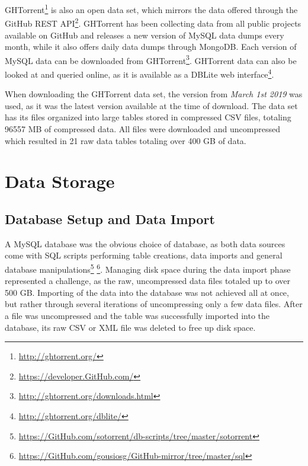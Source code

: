         GHTorrent\footnote{\label{GHTOrrent}\url{http://ghtorrent.org/}} is also an open data set, which mirrors the data offered through the GitHub REST API\footnote{\url{https://developer.GitHub.com/}}. GHTorrent has been collecting data from all public projects available on GitHub and releases a new version of MySQL data dumps every month, while it also offers daily data dumps through MongoDB. Each version of MySQL data can be downloaded from GHTorrent\footnote{\label{GH_dowload}\url{http://ghtorrent.org/downloads.html}}. GHTorrent data can also be looked at and queried online, as it is available as a DBLite web interface\footnote{\label{GH_query}\url{http://ghtorrent.org/dblite/}}. 
            
        When downloading the GHTorrent data set, the version from \textit{March 1st 2019} was used, as it was the latest version available at the time of download. The data set has its files organized into large tables stored in compressed CSV files, totaling 96557 MB of compressed data. All files were downloaded and uncompressed which resulted in 21 raw data tables totaling over 400 GB of data.

\section{Data Storage}

    \subsection{Database Setup and Data Import}
        
        A MySQL database was the obvious choice of database, as both data sources come with SQL scripts performing table creations, data imports and general database manipulations\footnote{\label{SO_sql} \url{https://GitHub.com/sotorrent/db-scripts/tree/master/sotorrent}} \footnote{\label{GH_sql} \url{https://GitHub.com/gousiosg/GitHub-mirror/tree/master/sql}}. Managing disk space during the data import phase represented a challenge, as the raw, uncompressed data files totaled up to over 500 GB. Importing of the data into the database was not achieved all at once, but rather through several iterations of uncompressing only a few data files. After a file was uncompressed and the table was successfully imported into the database, its raw CSV or XML file was deleted to free up disk space. 
        
